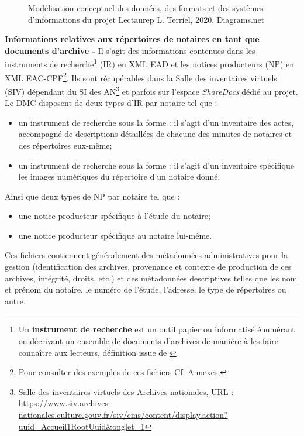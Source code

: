 \begin{figure}[h]
    \centering
    \centerline{}
    \caption{Modélisation conceptuel des données, des formats et des systèmes d'informations du projet Lectaurep \textcopyright L. Terriel, 2020, Diagrams.net}
    \label{fig:modélisation_données_lectaurep}
\end{figure}
\newpage
\textbf{Informations relatives aux répertoires de notaires en tant que documents d'archive -} Il s'agit des informations contenues dans les instruments de recherche\footnote{Un \textbf{instrument de recherche} est un outil papier ou informatisé énumérant ou décrivant un ensemble de documents d'archives de manière à les faire connaître aux lecteurs, définition issue de \cite{gueit-montchal_dir_abrege_2020}} (IR) en XML EAD et les notices producteurs (NP) 
en XML EAC-CPF\footnote{Pour consulter des exemples de ces fichiers Cf. Annexes, }.
Ils sont récupérables dans la Salle des inventaires virtuels (SIV) dépendant du SI des AN\footnote{Salle des inventaires virtuels des Archives nationales, URL : \url{https://www.siv.archives-nationales.culture.gouv.fr/siv/cms/content/display.action?uuid=Accueil1RootUuid&onglet=1}} et parfois sur l'espace \textit{ShareDocs} dédié au projet.\\

Le DMC disposent de deux types d'IR par notaire tel que :
\begin{itemize}
    \item un instrument de recherche sous la forme  : il s'agit d'un inventaire des actes, accompagné de descriptions détaillées de chacune des minutes de notaires et des répertoires eux-même;
    \item un instrument de recherche sous la forme  : il s'agit d'un inventaire spécifique les images numériques du répertoire d'un notaire donné.
\end{itemize}
Ainsi que deux types de NP par notaire tel que :
\begin{itemize}
    \item une notice producteur spécifique à l'étude du notaire;
    \item une notice producteur spécifique au notaire lui-même.
\end{itemize}
Ces fichiers contiennent généralement des métadonnées administratives pour la gestion (identification des archives, provenance et contexte de production de ces archives, intégrité, droits, etc.) et des métadonnées descriptives telles que les nom et prénom du notaire, le numéro de l'étude, l'adresse, le type de répertoires ou autre. \\


